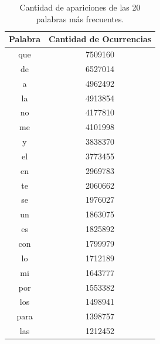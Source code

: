 \begin{table}[ht]
\centering
\label{tab:palabrasMasOcurrentes}
\begin{tabular}{ c c }
\toprule
Palabra & Cantidad de Ocurrencias \\ 
\midrule
que     & 7509160                 \\
de      & 6527014                 \\
a       & 4962492                 \\
la      & 4913854                 \\
no      & 4177810                 \\
me      & 4101998                 \\
y       & 3838370                 \\
el      & 3773455                 \\
en      & 2969783                 \\
te      & 2060662                 \\
se      & 1976027                 \\
un      & 1863075                 \\
es      & 1825892                 \\
con     & 1799979                 \\
lo      & 1712189                 \\
mi      & 1643777                 \\
por     & 1553382                 \\
los     & 1498941                 \\
para    & 1398757                 \\
las     & 1212452                 \\
\bottomrule
\end{tabular}
\caption{Cantidad de apariciones de las 20 palabras más frecuentes.}

\end{table}


